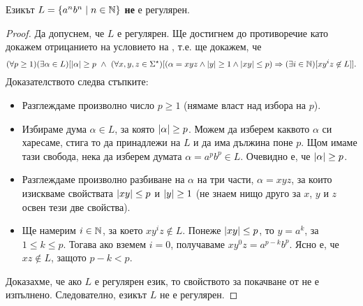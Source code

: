 \begin{example}
  Езикът $L = \{a^nb^n \mid n\in \mathbb{N}\}$ {\bf не} е регулярен.
\end{example}
\begin{proof}
  Да допуснем, че $L$ е регулярен.
  Ще достигнем до противоречие като докажем отрицанието на условието на ,
  т.е. ще докажем, че
  {\scriptsize
    \[(\forall p \geq 1)(\exists \alpha \in L)[\lvert{\alpha}\rvert \geq p\ \wedge\ (\forall x,y,z\in\Sigma^\star)[(\alpha = xyz \wedge \lvert{y}\rvert \geq 1\wedge \lvert{xy}\rvert \leq p) \Rightarrow (\exists i\in\mathbb{N})[xy^iz \not\in L]].\]}
  Доказателството следва стъпките:
  \begin{itemize}
  \item 
    Разглеждаме произволно число $p \geq 1$ (нямаме власт над избора на $p$).
  \item
    Избираме дума $\alpha \in L$, за която $\lvert{\alpha}\rvert \geq p$. Можем да изберем каквото $\alpha$
    си харесаме, стига то да принадлежи на $L$ и да има дължина поне $p$.
    Щом имаме тази свобода, нека да изберем думата $\alpha = a^pb^p \in L$. Очевидно е, че $\lvert{\alpha}\rvert \geq p$.
  \item
    Разглеждаме произволно разбиване на $\alpha$ на три части, $\alpha = xyz$,
    за които изискваме свойствата $\lvert{xy}\rvert \leq p$ и $\lvert{y}\rvert \geq 1$ (не знаем нищо друго за $x$, $y$ и $z$ освен тези две свойства).
  \item
    Ще намерим $i\in\mathbb{N}$, за което $xy^iz \not\in L$.
    Понеже $\lvert{xy}\rvert \leq p$, то $y = a^k$, за  $1\leq k \leq p$.
    Тогава ако вземем $i = 0$, получаваме $xy^0z = a^{p-k}b^p$.
    Ясно е, че $xz \not\in L$, защото $p-k < p$.
  \end{itemize}  
  Доказахме, че ако $L$ е регулярен език, то свойството за покачване от  не е изпълнено. Следователно, езикът $L$
  не е регулярен.  
\end{proof}

